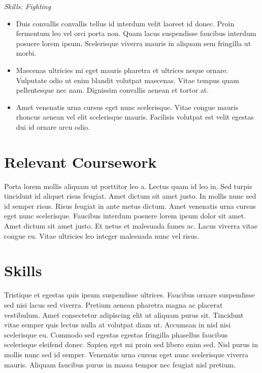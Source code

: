 \documentclass{resume}
\begin{document}
\textit{Skills: Fighting}
\vspace{-0.5em}
\begin{itemize}
\setlength\itemsep{-0.3em}
  \item Duis convallis convallis tellus id interdum velit laoreet id donec. Proin fermentum leo vel orci porta non. Quam lacus suspendisse faucibus interdum posuere lorem ipsum. Scelerisque viverra mauris in aliquam sem fringilla ut morbi. 
  \item Maecenas ultricies mi eget mauris pharetra et ultrices neque ornare. Vulputate odio ut enim blandit volutpat maecenas. Vitae tempus quam pellentesque nec nam. Dignissim convallis aenean et tortor at.
  \item Amet venenatis urna cursus eget nunc scelerisque. Vitae congue mauris rhoncus aenean vel elit scelerisque mauris. Facilisis volutpat est velit egestas dui id ornare arcu odio.
\end{itemize}
\vspace{-1em}

\section{Relevant Coursework}
Porta lorem mollis aliquam ut porttitor leo a. Lectus quam id leo in. Sed turpis tincidunt id aliquet risus feugiat. Amet dictum sit amet justo. In mollis nunc sed id semper risus. Risus feugiat in ante metus dictum. Amet venenatis urna cursus eget nunc scelerisque. Faucibus interdum posuere lorem ipsum dolor sit amet. Amet dictum sit amet justo. Et netus et malesuada fames ac. Lacus viverra vitae congue eu. Vitae ultricies leo integer malesuada nunc vel risus.

\section{Skills}
Tristique et egestas quis ipsum suspendisse ultrices. Faucibus ornare suspendisse sed nisi lacus sed viverra. Pretium aenean pharetra magna ac placerat vestibulum. Amet consectetur adipiscing elit ut aliquam purus sit. Tincidunt vitae semper quis lectus nulla at volutpat diam ut. Accumsan in nisl nisi scelerisque eu. Commodo sed egestas egestas fringilla phasellus faucibus scelerisque eleifend donec. Sapien eget mi proin sed libero enim sed. Nisl purus in mollis nunc sed id semper. Venenatis urna cursus eget nunc scelerisque viverra mauris. Aliquam faucibus purus in massa tempor nec feugiat nisl pretium.
\end{document}
